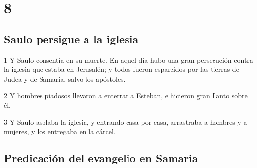 \chapter{8}

\section*{Saulo persigue a la iglesia}

\par 1 Y Saulo consentía en su muerte. En aquel día hubo una gran persecución contra la iglesia que estaba en Jerusalén; y todos fueron esparcidos por las tierras de Judea y de Samaria, salvo los apóstoles.
\par 2 Y hombres piadosos llevaron a enterrar a Esteban, e hicieron gran llanto sobre él.
\par 3 Y Saulo asolaba la iglesia, y entrando casa por casa, arrastraba a hombres y a mujeres, y los entregaba en la cárcel.

\section*{Predicación del evangelio en Samaria}

